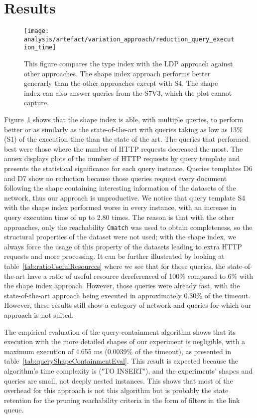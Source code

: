 \section{Results}

\begin{figure}[h]
    \centering
    \texttt{[image: analysis/artefact/variation\_approach/reduction\_query\_execution\_time]}
    \caption{
        This figure compares the type index with the LDP approach against other approaches.
        The shape index approach performs better generarly than the other approaches except with S4.
        The shape index can also answer queries from the S7V3, which the plot cannot capture.
    }
    \label{fig:compApproach}
\end{figure}


Figure~\ref{fig:compApproach} shows that the shape index is able, with multiple queries, to perform better or as similarly as the state-of-the-art with queries taking as low as 13\% (S1) of the execution time than the state of the art.
The queries that performed best were those where the number of HTTP requests decreased the most.
The annex displays plots of the number of HTTP requests by query template and presents the statistical significance for each query instance.
Queries templates D6 and D7 show no reduction because those queries request every document following the shape containing interesting information of the datasets of the network, thus
our approach is unproductive.
We notice that query template S4 with the shape index performed worse in every instance, with an increase in query execution time of up to 2.80 times.
The reason is that with the other approaches, only the reachability \texttt{Cmatch} was used to obtain completeness, so the structural properties of the dataset were not used; with the shape index, we always force the usage of this property of the datasets leading to extra HTTP requests and more processing.
It can be further illustrated by looking at table~\ref{tab:ratioUsefulResources} where we see that for those queries, the state-of-the-art have a ratio of useful resource dereferenced of 100\% compared to 6\% with the shape index approach.
However, those queries were already fast, with the state-of-the-art approach being executed in approximately 0.30\% of the timeout.
However, these results still show a category of network and queries for which our approach is not suited.

The empirical evaluation of the query-containment algorithm shows that its execution with the more detailed shapes of our experiment is negligible, with a maximum execution of 4.655 ms (0.0039\% of the timeout), as presented in table~\ref{tab:queryShapeContainmentEval}.
This result is expected because the algorithm's time complexity is ("TO INSERT"), and the experiments' shapes and queries are small, not deeply nested instances.
This shows that most of the overhead for this approach is not this algorithm but is probably the state retention for the pruning reachability criteria in the form of filters in the link queue.


